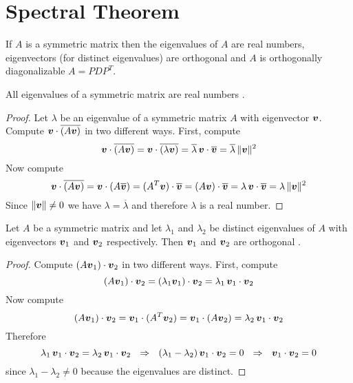 \section{Spectral Theorem}

\begin{bigidea}
If $A$ is a symmetric matrix then the eigenvalues of $A$ are real numbers, eigenvectors (for distinct eigenvalues) are orthogonal and $A$ is orthogonally diagonalizable $A = PDP^T$.
\end{bigidea}

\begin{proposition}
All eigenvalues of a symmetric matrix are real numbers \cite[p.307]{KN}.

\begin{proof}
Let $\lambda$ be an eigenvalue of a symmetric matrix $A$ with eigenvector $\boldsymbol{v}$. Compute $\boldsymbol{v} \cdot \overline{(A \boldsymbol{v})}$ in two different ways. First, compute
$$
\boldsymbol{v} \cdot \overline{(A \boldsymbol{v})}
= \boldsymbol{v} \cdot \overline{(\lambda \boldsymbol{v})}
= \overline{\lambda} \, \boldsymbol{v} \cdot  \overline{\boldsymbol{v}}
= \overline{\lambda} \, \| \boldsymbol{v} \|^2
$$
Now compute
$$
\boldsymbol{v} \cdot \overline{(A \boldsymbol{v})}
= \boldsymbol{v} \cdot (A \overline{\boldsymbol{v}} )
= (A^T \boldsymbol{v}) \cdot \overline{\boldsymbol{v}}
= (A \boldsymbol{v}) \cdot \overline{\boldsymbol{v}}
= \lambda \, \boldsymbol{v} \cdot \overline{\boldsymbol{v}}
= \lambda \, \| \boldsymbol{v} \|^2
$$
Since $\| \boldsymbol{v} \| \not= 0$ we have $\lambda = \overline{\lambda}$ and therefore $\lambda$ is a real number.
\end{proof}
\end{proposition}

\begin{proposition}
Let $A$ be a symmetric matrix and let $\lambda_1$ and $\lambda_2$ be distinct eigenvalues of $A$ with eigenvectors $\boldsymbol{v}_1$ and $\boldsymbol{v}_2$ respectively. Then $\boldsymbol{v}_1$ and $\boldsymbol{v}_2$ are orthogonal \cite[p.427]{KN}.

\begin{proof}
Compute $(A \boldsymbol{v}_1) \cdot \boldsymbol{v}_2$ in two different ways. First, compute
$$
(A \boldsymbol{v}_1) \cdot \boldsymbol{v}_2
= (\lambda_1 \boldsymbol{v}_1) \cdot \boldsymbol{v}_2
= \lambda_1 \, \boldsymbol{v}_1 \cdot \boldsymbol{v}_2
$$
Now compute
$$
(A \boldsymbol{v}_1) \cdot \boldsymbol{v}_2
= \boldsymbol{v}_1 \cdot (A^T \boldsymbol{v}_2)
= \boldsymbol{v}_1 \cdot (A \boldsymbol{v}_2)
= \lambda_2 \, \boldsymbol{v}_1 \cdot \boldsymbol{v}_2
$$
Therefore
$$
\lambda_1 \, \boldsymbol{v}_1 \cdot \boldsymbol{v}_2 = \lambda_2 \, \boldsymbol{v}_1 \cdot \boldsymbol{v}_2
\ \ \Rightarrow \ \
(\lambda_1 - \lambda_2) \, \boldsymbol{v}_1 \cdot \boldsymbol{v}_2 = 0
\ \ \Rightarrow \ \
\boldsymbol{v}_1 \cdot \boldsymbol{v}_2 = 0
$$
since $\lambda_1 - \lambda_2 \not = 0$ because the eigenvalues are distinct.
\end{proof}
\end{proposition}

